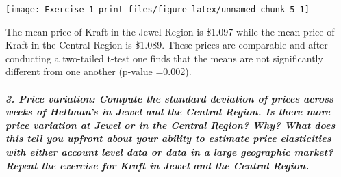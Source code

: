 \documentclass[]{article}
\newenvironment{Shaded}{\begin{snugshade}}{\end{snugshade}}
\newcommand{\DataTypeTok}[1]{\textcolor[rgb]{0.13,0.29,0.53}{#1}}
\newcommand{\KeywordTok}[1]{\textcolor[rgb]{0.13,0.29,0.53}{\textbf{#1}}}
\newcommand{\NormalTok}[1]{#1}
\newcommand{\OperatorTok}[1]{\textcolor[rgb]{0.81,0.36,0.00}{\textbf{#1}}}
\newcommand{\StringTok}[1]{\textcolor[rgb]{0.31,0.60,0.02}{#1}}
\let\oldsubparagraph\subparagraph
\renewcommand{\subparagraph}[1]{\oldsubparagraph{#1}\mbox{}}
\begin{document}
\begin{Shaded}
\end{Shaded}

\begin{center}\texttt{[image: Exercise\_1\_print\_files/figure-latex/unnamed-chunk-5-1]} \end{center}

The mean price of Kraft in the Jewel Region is \$1.097 while the mean
price of Kraft in the Central Region is \$1.089. These prices are
comparable and after conducting a two-tailed t-test one finds that the
means are not significantly different from one another (p-value =0.002).

\hypertarget{price-variation-compute-the-standard-deviation-of-prices-across-weeks-of-hellmans-in-jewel-and-the-central-region.-is-there-more-price-variation-at-jewel-or-in-the-central-region-why-what-does-this-tell-you-upfront-about-your-ability-to-estimate-price-elasticities-with-either-account-level-data-or-data-in-a-large-geographic-market-repeat-the-exercise-for-kraft-in-jewel-and-the-central-region.}{%
\subparagraph{3. Price variation: Compute the standard deviation of
prices across weeks of Hellman's in Jewel and the Central Region. Is
there more price variation at Jewel or in the Central Region? Why? What
does this tell you upfront about your ability to estimate price
elasticities with either account level data or data in a large
geographic market? Repeat the exercise for Kraft in Jewel and the
Central
Region.}\label{price-variation-compute-the-standard-deviation-of-prices-across-weeks-of-hellmans-in-jewel-and-the-central-region.-is-there-more-price-variation-at-jewel-or-in-the-central-region-why-what-does-this-tell-you-upfront-about-your-ability-to-estimate-price-elasticities-with-either-account-level-data-or-data-in-a-large-geographic-market-repeat-the-exercise-for-kraft-in-jewel-and-the-central-region.}}
\end{document}
